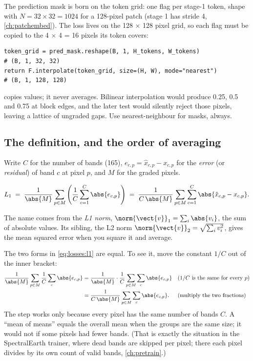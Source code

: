 The prediction mask is born on the token grid: one flag per stage-1 token, shape
 with $N = 32 \times 32 = 1024$ for a 128-pixel patch (stage 1 has stride 4,
\cref{ch:patchembed}). The loss lives on the 128 $\times$ 128 pixel grid, so each flag must be
copied to the 4 $\times$ 4 = 16 pixels its token covers:
\begin{lstlisting}
token_grid = pred_mask.reshape(B, 1, H_tokens, W_tokens)                    # (B, 1, 32, 32)
return F.interpolate(token_grid, size=(H, W), mode="nearest")               # (B, 1, 128, 128)
\end{lstlisting}
 copies values; it never averages. Bilinear interpolation would produce
0.25, 0.5 and 0.75 at block edges, and the later test  would silently
reject those pixels, leaving a lattice of ungraded gaps. Use nearest-neighbour for masks,
always.

\subsection{The definition, and the order of averaging}

Write $C$ for the number of bands (165), $e_{c,p} = \hat{x}_{c,p} - x_{c,p}$ for the
\emph{error} (or \emph{residual}) of band $c$ at pixel $p$, and $M$ for the graded pixels.

\begin{definition}
\begin{equation}\label{eq:losses:l1}
L_1 \;=\; \frac{1}{\abs{M}} \sum_{p \in M} \left( \frac{1}{C} \sum_{c=1}^{C} \abs{e_{c,p}} \right)
\;=\; \frac{1}{C\,\abs{M}} \sum_{p \in M} \sum_{c=1}^{C} \abs{\hat{x}_{c,p} - x_{c,p}} .
\end{equation}
\end{definition}

The name comes from the \emph{L1 norm}, $\norm{\vect{v}}_1 = \sum_i \abs{v_i}$,
the sum of absolute values. Its sibling, the L2 norm $\norm{\vect{v}}_2 = \sqrt{\sum_i v_i^2}$,
gives the mean squared error when you square it and average.

The two forms in \cref{eq:losses:l1} are equal. To see it, move the constant $1/C$ out of the
inner bracket:
\begin{align*}
\frac{1}{\abs{M}} \sum_{p \in M} \frac{1}{C} \sum_{c} \abs{e_{c,p}}
&= \frac{1}{\abs{M}} \cdot \frac{1}{C} \sum_{p \in M} \sum_{c} \abs{e_{c,p}}
  && \text{($1/C$ is the same for every $p$)} \\
&= \frac{1}{C\,\abs{M}} \sum_{p \in M} \sum_{c} \abs{e_{c,p}} .
  && \text{(multiply the two fractions)}
\end{align*}
The step works only because every pixel has the same number of bands $C$. A ``mean of means''
equals the overall mean when the groups are the same size; it would not if some pixels had
fewer bands. (That is exactly the situation in the SpectralEarth trainer, where dead bands are
skipped per pixel; there each pixel divides by its own count of valid bands,
\cref{ch:pretrain}.)

